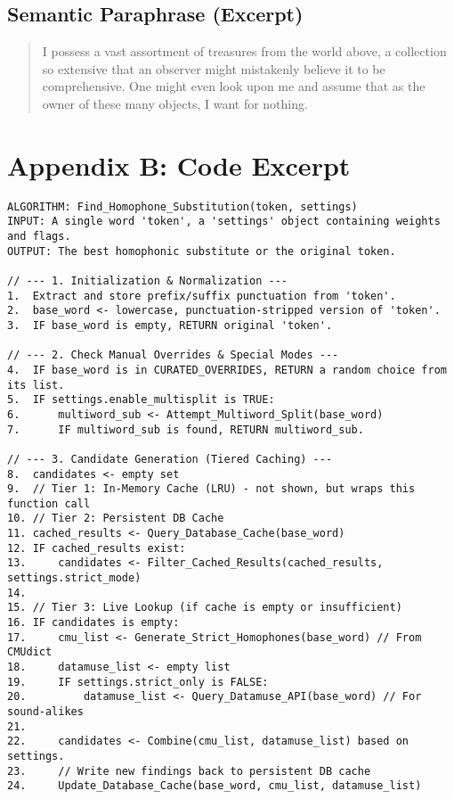 \documentclass[12pt]{article}
\begin{document}
\subsection{Semantic Paraphrase (Excerpt)}
\begin{quote}
I possess a vast assortment of treasures from the world above, a collection so extensive that an observer might mistakenly believe it to be comprehensive. One might even look upon me and assume that as the owner of these many objects, I want for nothing.
\end{quote}

\section{Appendix B: Code Excerpt}
\begin{verbatim}
ALGORITHM: Find_Homophone_Substitution(token, settings)
INPUT: A single word 'token', a 'settings' object containing weights and flags.
OUTPUT: The best homophonic substitute or the original token.

// --- 1. Initialization & Normalization ---
1.  Extract and store prefix/suffix punctuation from 'token'.
2.  base_word <- lowercase, punctuation-stripped version of 'token'.
3.  IF base_word is empty, RETURN original 'token'.

// --- 2. Check Manual Overrides & Special Modes ---
4.  IF base_word is in CURATED_OVERRIDES, RETURN a random choice from its list.
5.  IF settings.enable_multisplit is TRUE:
6.      multiword_sub <- Attempt_Multiword_Split(base_word)
7.      IF multiword_sub is found, RETURN multiword_sub.

// --- 3. Candidate Generation (Tiered Caching) ---
8.  candidates <- empty set
9.  // Tier 1: In-Memory Cache (LRU) - not shown, but wraps this function call
10. // Tier 2: Persistent DB Cache
11. cached_results <- Query_Database_Cache(base_word)
12. IF cached_results exist:
13.     candidates <- Filter_Cached_Results(cached_results, settings.strict_mode)
14.
15. // Tier 3: Live Lookup (if cache is empty or insufficient)
16. IF candidates is empty:
17.     cmu_list <- Generate_Strict_Homophones(base_word) // From CMUdict
18.     datamuse_list <- empty list
19.     IF settings.strict_only is FALSE:
20.         datamuse_list <- Query_Datamuse_API(base_word) // For sound-alikes
21.
22.     candidates <- Combine(cmu_list, datamuse_list) based on settings.
23.     // Write new findings back to persistent DB cache
24.     Update_Database_Cache(base_word, cmu_list, datamuse_list)


\end{verbatim}
\end{document}
